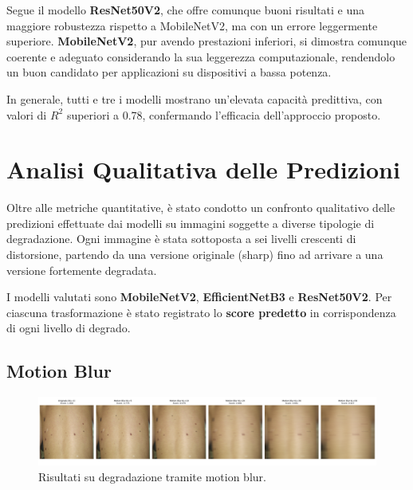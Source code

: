Segue il modello \textbf{ResNet50V2}, che offre comunque buoni risultati e una maggiore robustezza rispetto a MobileNetV2, ma con un errore leggermente superiore. \textbf{MobileNetV2}, pur avendo prestazioni inferiori, si dimostra comunque coerente e adeguato considerando la sua leggerezza computazionale, rendendolo un buon candidato per applicazioni su dispositivi a bassa potenza.

In generale, tutti e tre i modelli mostrano un'elevata capacità predittiva, con valori di $R^2$ superiori a 0.78, confermando l’efficacia dell’approccio proposto.
\section{Analisi Qualitativa delle Predizioni}
\label{sec:analisi_qualitativa}

Oltre alle metriche quantitative, è stato condotto un confronto qualitativo delle predizioni effettuate dai modelli su immagini soggette a diverse tipologie di degradazione. Ogni immagine è stata sottoposta a sei livelli crescenti di distorsione, partendo da una versione originale (sharp) fino ad arrivare a una versione fortemente degradata.

I modelli valutati sono \textbf{MobileNetV2}, \textbf{EfficientNetB3} e \textbf{ResNet50V2}. Per ciascuna trasformazione è stato registrato lo \textbf{score predetto} in corrispondenza di ogni livello di degrado.

\subsection{Motion Blur}
\begin{figure}[H]
    \centering
    \includegraphics[width=\textwidth]{imgs/motionblur.png}
    \caption{Risultati su degradazione tramite motion blur.}
    \label{fig:motion_blur}
\end{figure}


